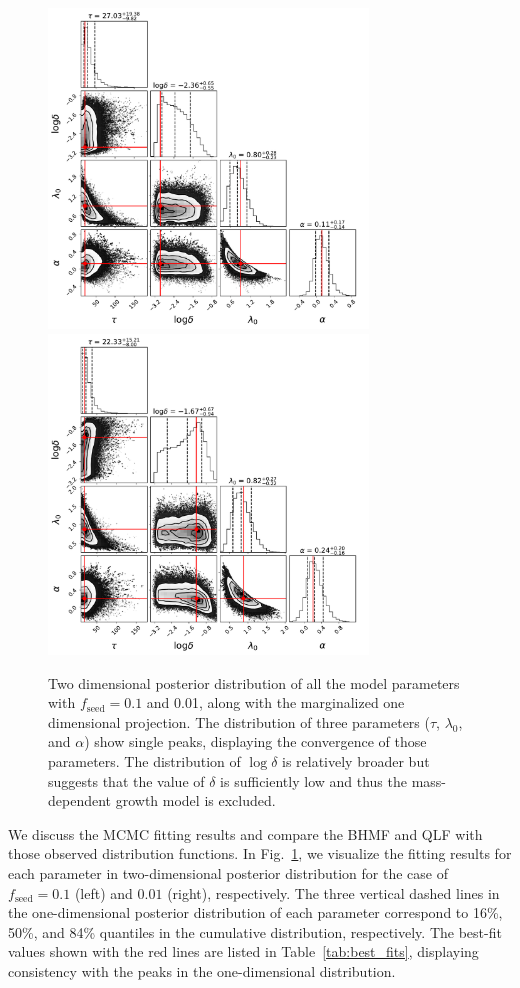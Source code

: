 \documentclass[twocolumn, twocolappendix]{aastex63}
\newcommand{\fseed}{f_\mathrm{seed}}
\begin{document}
\begin{CJK*}{UTF8}{gbsn}
\begin{figure}
\centering
\includegraphics[width=85mm]{f1_corner.pdf}
\includegraphics[width=85mm]{f2_corner.pdf}
\caption{
Two dimensional posterior distribution of all the model parameters with $\fseed=0.1$ and 0.01, 
along with the marginalized one dimensional projection.
The distribution of three parameters ($\tau$, $\lambda_0$, and $\alpha$) show single peaks,
displaying the convergence of those parameters.
The distribution of $\log\delta$ is relatively broader but suggests that the value of $\delta$
is sufficiently low and thus the mass-dependent growth model is excluded.
}
\label{fig:contour}
\vspace{5mm}
\end{figure}
%


We discuss the MCMC fitting results and compare the BHMF and QLF with those observed distribution functions.
In Fig.~\ref{fig:contour}, we visualize the fitting results for each parameter in two-dimensional 
posterior distribution for the case of $\fseed= 0.1$ (left) and $0.01$ (right), respectively.
The three vertical dashed lines in the one-dimensional posterior distribution of each parameter
correspond to 16\%, 50\%, and 84\% quantiles in the cumulative distribution, respectively.
The best-fit values shown with the red lines are listed in Table~\ref{tab:best_fits},
displaying consistency with the peaks in the one-dimensional distribution.



\end{CJK*}
\end{document}
